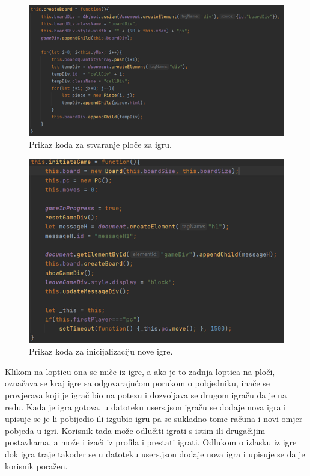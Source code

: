 \begin{figure}[H]
\centering
\includegraphics[width=14cm]{slike-kod/Slika9.png}
\caption{Prikaz koda za stvaranje ploče za igru.}
\label{}
\end{figure}


\begin{figure}[H]
\centering
\includegraphics[width=14cm]{slike-kod/Slika10.png}
\caption{Prikaz koda za inicijalizaciju nove igre.}
\label{}
\end{figure}


 Klikom na lopticu ona se miče iz igre, a ako je to zadnja loptica na ploči, označava se kraj igre sa odgovarajućom porukom o pobjedniku, inače se provjerava koji je igrač bio na potezu i dozvoljava se drugom igraču da je na redu. Kada je igra gotova, u datoteku users.json igraču se dodaje nova igra i upisuje se je li pobijedio ili izgubio igru pa se sukladno tome računa i novi omjer pobjeda u igri. Korisnik tada može odlučiti igrati s istim ili drugačijim postavkama, a može i izaći iz profila i prestati igrati. Odlukom o izlasku iz igre dok igra traje također se u datoteku users.json dodaje nova igra i upisuje se da je korisnik poražen.

